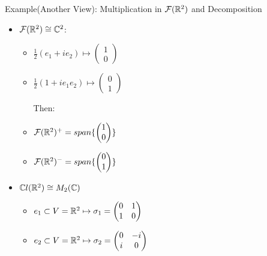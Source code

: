 \begin{frame}{Example(Another View): Multiplication in $\mathcal F(\mathbb R^2)$ and Decomposition} %
    
    \begin{itemize}
    
    \item $\mathcal F(\mathbb R^2) \cong \mathbb C^2$:
    
        \begin{itemize}
        
        \item $\frac{1}{2}(e_1 + ie_2) \mapsto \begin{pmatrix} 1\\ 0 \end{pmatrix}$
        
        \item $\frac{1}{2}(1 + ie_1e_2) \mapsto \begin{pmatrix} 0\\ 1 \end{pmatrix}$
        
        Then:
        
        \item $\mathcal F(\mathbb R^2)^+ = span\{\begin{pmatrix} 1\\ 0 \end{pmatrix}\}$
        
        \item $\mathcal F(\mathbb R^2)^- = span\{\begin{pmatrix} 0\\ 1 \end{pmatrix}\}$
        
        \end{itemize}
    
    \item $\mathbb C l(\mathbb R^2) \cong M_2(\mathbb C)$
    
        \begin{itemize}
        
        \item $e_1 \subset V = \mathbb R^2 \mapsto \sigma_1 = \begin{pmatrix} 0 & 1 \\ 1 & 0 \end{pmatrix}$
        
        \item $e_2 \subset V = \mathbb R^2 \mapsto \sigma_2 = \begin{pmatrix} 0 & -i \\ i & 0 \end{pmatrix}$
        

\end{itemize}
\end{itemize}
\end{frame}
